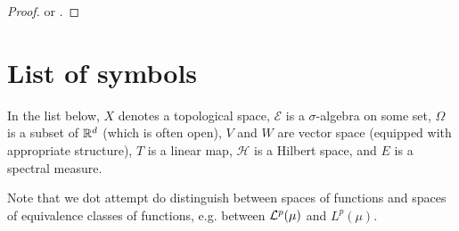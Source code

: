 \documentclass[article, a4paper, 11pt, oneside]{memoir}
\makeatletter
\numberwithin{equation}{chapter}
\newcommand{\calH}{\mathcal{H}}
\newcommand{\calE}{\mathcal{E}}
\theoremstyle{myexample}
\theoremstyle{myexample}
\theoremstyle{myexamplebreak}
\theoremstyle{myexamplebreak}
\theoremstyle{nonumberplain}
\newtheorem{proof}{\protect\@proof}
\theoremstyle{MyNonumberplain}
\newcommand{\@proof}{}
\renewcommand{\@proof}{Proof}%
\renewcommand{\@proof}{Bevis}%
\makeatother
\begin{document}
\begin{proof}
    \textcite[Theorem~12.23]{rudinfunctional} or \textcite[Theorem~3.65]{skibsted2019}.
\end{proof}



\chapter*{List of symbols}

In the list below, $X$ denotes a topological space, $\calE$ is a $\sigma$-algebra on some set, $\Omega$ is a subset of $\mathbb{R}^d$ (which is often open), $V$ and $W$ are vector space (equipped with appropriate structure), $T$ is a linear map, $\calH$ is a Hilbert space, and $E$ is a spectral measure.

Note that we dot attempt do distinguish between spaces of functions and spaces of equivalence classes of functions, e.g. between $\mathcal{L}^p(\mu)$ and $L^p(\mu)$.
\end{document}
